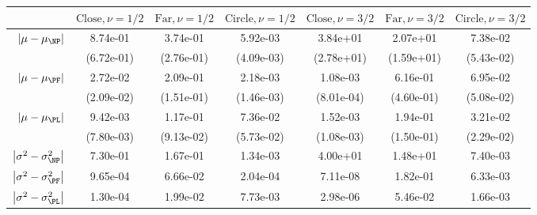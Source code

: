 \begin{tabular}{r|cccccc}
\toprule
                                       & $\mathrm{Close}, \nu = 1 / 2$ & $\mathrm{Far}, \nu = 1 / 2$ & $\mathrm{Circle}, \nu = 1 / 2$ & $\mathrm{Close}, \nu = 3 / 2$ & $\mathrm{Far}, \nu = 3 / 2$ & $\mathrm{Circle}, \nu = 3 / 2$ \\ \hline
          $\left|\mu-\mu_{\NP}\right|$ &                      8.74e-01 &                    3.74e-01 &                       5.92e-03 &                      3.84e+01 &                    2.07e+01 &                       7.38e-02 \\
                                       &                    (6.72e-01) &                  (2.76e-01) &                     (4.09e-03) &                    (2.78e+01) &                  (1.59e+01) &                     (5.43e-02) \\
          $\left|\mu-\mu_{\PF}\right|$ &                      2.72e-02 &                    2.09e-01 &                       2.18e-03 &                      1.08e-03 &                    6.16e-01 &                       6.95e-02 \\
                                       &                    (2.09e-02) &                  (1.51e-01) &                     (1.46e-03) &                    (8.01e-04) &                  (4.60e-01) &                     (5.08e-02) \\
          $\left|\mu-\mu_{\PL}\right|$ &                      9.42e-03 &                    1.17e-01 &                       7.36e-02 &                      1.52e-03 &                    1.94e-01 &                       3.21e-02 \\
                                       &                    (7.80e-03) &                  (9.13e-02) &                     (5.73e-02) &                    (1.08e-03) &                  (1.50e-01) &                     (2.29e-02) \\
$\left|\sigma^2-\sigma_{\NP}^2\right|$ &                      7.30e-01 &                    1.67e-01 &                       1.34e-03 &                      4.00e+01 &                    1.48e+01 &                       7.40e-03 \\
$\left|\sigma^2-\sigma_{\PF}^2\right|$ &                      9.65e-04 &                    6.66e-02 &                       2.04e-04 &                      7.11e-08 &                    1.82e-01 &                       6.33e-03 \\
$\left|\sigma^2-\sigma_{\PL}^2\right|$ &                      1.30e-04 &                    1.99e-02 &                       7.73e-03 &                      2.98e-06 &                    5.46e-02 &                       1.66e-03 \\

\end{tabular}

